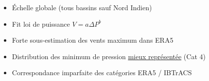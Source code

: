 \documentclass[aspectratio=169, usepdftitle=false, xcolor={dvipsnames}, 9pt,table]{beamer}
\begin{document}
\begin{frame}
\begin{columns}
\begin{column}{0.5\textwidth}
\begin{examples}[Méthodologie]
\begin{itemize}
                    \item Échelle globale (tous bassins sauf Nord Indien)
                    \item Fit loi de puissance $V = a\Delta P^b$ \parencite{atkinson_tropical_1977}
                \end{itemize}
            \end{examples}
            \vspace{2em}
            \begin{block}
                \begin{itemize}
                    \item \alert{Forte sous-estimation} des vents maximum dans ERA5
                    \item Distribution des minimum de pression \underline{mieux représentée} (Cat 4)
                    \item Correspondance imparfaite des catégories ERA5 / IBTrACS
                \end{itemize}
            \end{block}
        \end{column}
    \end{columns} 
\end{frame}
\end{document}
